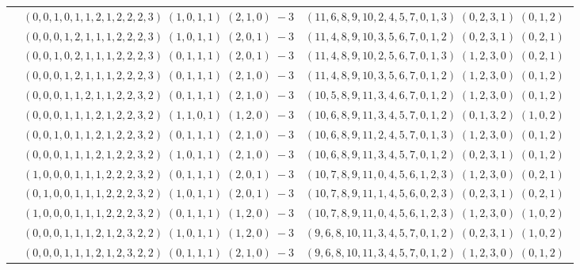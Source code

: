 \documentclass[11pt]{article}
\begin{document}
\begin{longtable}[l]{|c|c|c|}
 \cline{2-3} 
 & $(0 ,0 ,1 ,0 ,1 ,1 ,2 ,1 ,2 ,2 ,2 ,3) \;(1 ,0 ,1 ,1) \;(2 ,1 ,0) \;-3$ & $(11 ,6 ,8 ,9 ,10 ,2 ,4 ,5 ,7 ,0 ,1 ,3) \;(0 ,2 ,3 ,1) \;(0 ,1 ,2) \;$\\ 
 \cline{2-3} 
 & $(0 ,0 ,0 ,1 ,2 ,1 ,1 ,1 ,2 ,2 ,2 ,3) \;(1 ,0 ,1 ,1) \;(2 ,0 ,1) \;-3$ & $(11 ,4 ,8 ,9 ,10 ,3 ,5 ,6 ,7 ,0 ,1 ,2) \;(0 ,2 ,3 ,1) \;(0 ,2 ,1) \;$\\ 
 \cline{2-3} 
 & $(0 ,0 ,1 ,0 ,2 ,1 ,1 ,1 ,2 ,2 ,2 ,3) \;(0 ,1 ,1 ,1) \;(2 ,0 ,1) \;-3$ & $(11 ,4 ,8 ,9 ,10 ,2 ,5 ,6 ,7 ,0 ,1 ,3) \;(1 ,2 ,3 ,0) \;(0 ,2 ,1) \;$\\ 
 \cline{2-3} 
 & $(0 ,0 ,0 ,1 ,2 ,1 ,1 ,1 ,2 ,2 ,2 ,3) \;(0 ,1 ,1 ,1) \;(2 ,1 ,0) \;-3$ & $(11 ,4 ,8 ,9 ,10 ,3 ,5 ,6 ,7 ,0 ,1 ,2) \;(1 ,2 ,3 ,0) \;(0 ,1 ,2) \;$\\ 
 \cline{2-3} 
 & $(0 ,0 ,0 ,1 ,1 ,2 ,1 ,1 ,2 ,2 ,3 ,2) \;(0 ,1 ,1 ,1) \;(2 ,1 ,0) \;-3$ & $(10 ,5 ,8 ,9 ,11 ,3 ,4 ,6 ,7 ,0 ,1 ,2) \;(1 ,2 ,3 ,0) \;(0 ,1 ,2) \;$\\ 
 \cline{2-3} 
 & $(0 ,0 ,0 ,1 ,1 ,1 ,2 ,1 ,2 ,2 ,3 ,2) \;(1 ,1 ,0 ,1) \;(1 ,2 ,0) \;-3$ & $(10 ,6 ,8 ,9 ,11 ,3 ,4 ,5 ,7 ,0 ,1 ,2) \;(0 ,1 ,3 ,2) \;(1 ,0 ,2) \;$\\ 
 \cline{2-3} 
 & $(0 ,0 ,1 ,0 ,1 ,1 ,2 ,1 ,2 ,2 ,3 ,2) \;(0 ,1 ,1 ,1) \;(2 ,1 ,0) \;-3$ & $(10 ,6 ,8 ,9 ,11 ,2 ,4 ,5 ,7 ,0 ,1 ,3) \;(1 ,2 ,3 ,0) \;(0 ,1 ,2) \;$\\ 
 \cline{2-3} 
 & $(0 ,0 ,0 ,1 ,1 ,1 ,2 ,1 ,2 ,2 ,3 ,2) \;(1 ,0 ,1 ,1) \;(2 ,1 ,0) \;-3$ & $(10 ,6 ,8 ,9 ,11 ,3 ,4 ,5 ,7 ,0 ,1 ,2) \;(0 ,2 ,3 ,1) \;(0 ,1 ,2) \;$\\ 
 \cline{2-3} 
 & $(1 ,0 ,0 ,0 ,1 ,1 ,1 ,2 ,2 ,2 ,3 ,2) \;(0 ,1 ,1 ,1) \;(2 ,0 ,1) \;-3$ & $(10 ,7 ,8 ,9 ,11 ,0 ,4 ,5 ,6 ,1 ,2 ,3) \;(1 ,2 ,3 ,0) \;(0 ,2 ,1) \;$\\ 
 \cline{2-3} 
 & $(0 ,1 ,0 ,0 ,1 ,1 ,1 ,2 ,2 ,2 ,3 ,2) \;(1 ,0 ,1 ,1) \;(2 ,0 ,1) \;-3$ & $(10 ,7 ,8 ,9 ,11 ,1 ,4 ,5 ,6 ,0 ,2 ,3) \;(0 ,2 ,3 ,1) \;(0 ,2 ,1) \;$\\ 
 \cline{2-3} 
 & $(1 ,0 ,0 ,0 ,1 ,1 ,1 ,2 ,2 ,2 ,3 ,2) \;(0 ,1 ,1 ,1) \;(1 ,2 ,0) \;-3$ & $(10 ,7 ,8 ,9 ,11 ,0 ,4 ,5 ,6 ,1 ,2 ,3) \;(1 ,2 ,3 ,0) \;(1 ,0 ,2) \;$\\ 
 \cline{2-3} 
 & $(0 ,0 ,0 ,1 ,1 ,1 ,2 ,1 ,2 ,3 ,2 ,2) \;(1 ,0 ,1 ,1) \;(1 ,2 ,0) \;-3$ & $(9 ,6 ,8 ,10 ,11 ,3 ,4 ,5 ,7 ,0 ,1 ,2) \;(0 ,2 ,3 ,1) \;(1 ,0 ,2) \;$\\ 
 \cline{2-3} 
 & $(0 ,0 ,0 ,1 ,1 ,1 ,2 ,1 ,2 ,3 ,2 ,2) \;(0 ,1 ,1 ,1) \;(2 ,1 ,0) \;-3$ & $(9 ,6 ,8 ,10 ,11 ,3 ,4 ,5 ,7 ,0 ,1 ,2) \;(1 ,2 ,3 ,0) \;(0 ,1 ,2) \;$\\ 

\end{longtable}
\end{document}
